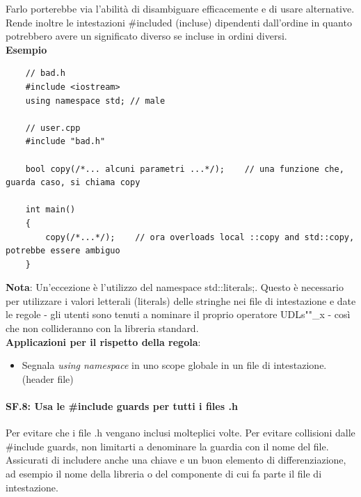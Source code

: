 \textsf{\small Farlo porterebbe via l'abilità di disambiguare efficacemente e di usare alternative. Rende inoltre le intestazioni \#included (incluse) dipendenti dall'ordine in quanto potrebbero avere un significato diverso se incluse in ordini diversi. } \\

\textsf{\small \textbf{Esempio}}

\begin{lstlisting}
	// bad.h
	#include <iostream>
	using namespace std; // male
	
	// user.cpp
	#include "bad.h"
	
	bool copy(/*... alcuni parametri ...*/);    // una funzione che, guarda caso, si chiama copy
	
	int main()
	{
		copy(/*...*/);    // ora overloads local ::copy and std::copy, potrebbe essere ambiguo
	}
\end{lstlisting}

\textsf{\small \textbf{Nota}: Un'eccezione è l'utilizzo del namespace std::literals;. Questo è necessario per utilizzare i valori letterali (literals) delle stringhe nei file di intestazione e date le regole - gli utenti sono tenuti a nominare il proprio operatore UDLs""\_x - così che non collideranno con la libreria standard.} \\

\textsf{\small \textbf{Applicazioni per il rispetto della regola}: }

\begin{itemize}
	\item \textsf{\small Segnala \emph{using namespace} in uno scope globale in un file di intestazione. (header file)}
\end{itemize}

\paragraph{SF.8: Usa le \#include guards per tutti i files .h}

\textsf{\small Per evitare che i file .h vengano inclusi molteplici volte. Per evitare collisioni dalle \#include guards, non limitarti a denominare la guardia con il nome del file. Assicurati di includere anche una chiave e un buon elemento di differenziazione, ad esempio il nome della libreria o del componente di cui fa parte il file di intestazione.} \\

